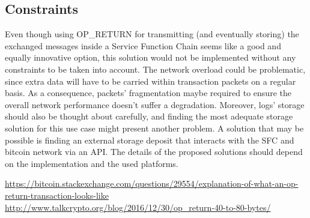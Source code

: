 \documentclass[a4paper]{article}
\begin{document}
\subsection{Constraints}
Even though using OP\_RETURN for transmitting (and eventually storing) the exchanged messages inside a Service Function Chain seems like a good and equally innovative option, this solution would not be implemented without any constraints to be taken into account. The network overload could be problematic, since extra data will have to be carried within transaction packets on a regular basis. As a consequence, packets' fragmentation maybe required to ensure the overall network performance doesn't suffer a degradation. Moreover, logs' storage should also be thought about carefully, and finding the most adequate storage solution for this use case might present another problem. A solution that may be possible is finding an external storage deposit that interacts with the SFC and bitcoin network via an API. The details of the  proposed solutions should depend on the implementation and the used platforms.  




\begin{thebibliography}{9}
\url{https://bitcoin.stackexchange.com/questions/29554/explanation-of-what-an-op-return-transaction-looks-like}
\url{http://www.talkcrypto.org/blog/2016/12/30/op_return-40-to-80-bytes/}
\end{thebibliography}
\end{document}
